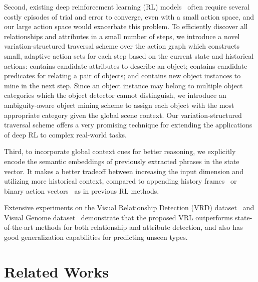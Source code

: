 \documentclass[10pt,twocolumn,letterpaper]{article}
\begin{document}
Second, existing deep reinforcement learning (RL) models~\cite{silver2016mastering} often require several costly episodes of trial and error to converge, even with a small action space, and our large action space would exacerbate this problem. To efficiently discover all relationships and attributes in a small number of steps, we introduce a novel variation-structured traversal scheme over the action graph which constructs small, adaptive action sets  for each step based on the current state and historical actions:  contains candidate attributes to describe an object;  contains candidate predicates for relating a pair of objects; and  contains new object instances to mine in the next step. Since an object instance may belong to multiple object categories which the object detector cannot distinguish, we introduce an ambiguity-aware object mining scheme to assign each object with the most appropriate category given the global scene context.  Our variation-structured traversal scheme offers a very promising technique for extending the applications of deep RL to complex real-world tasks.

Third, to incorporate global context cues for better reasoning, we explicitly encode the semantic embeddings of previously extracted phrases in the state vector. It {makes a better} tradeoff between increasing the input dimension and utilizing more historical context, compared to appending history frames~\cite{zhu2016target} or binary action vectors~\cite{caicedo2015active} as in previous RL methods.  

Extensive experiments on the Visual Relationship Detection (VRD) dataset~\cite{lu2016visual} and Visual Genome dataset~\cite{krishna2016visual} demonstrate that the proposed VRL outperforms {state-of-the-art methods} for both relationship and attribute detection, and also has good generalization capabilities for predicting unseen types. 


\section{Related Works}
\end{document}
